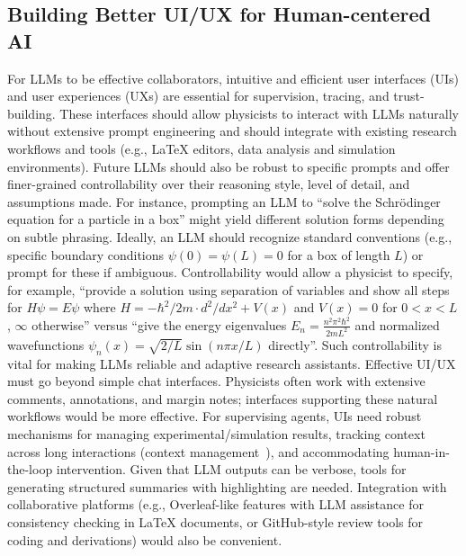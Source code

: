 \subsection{Building Better UI/UX for Human-centered AI}
\label{sec:building_better_ui_ux}
For LLMs to be effective collaborators, intuitive and efficient user interfaces (UIs) and user experiences (UXs) are essential for supervision, tracing, and trust-building. These interfaces should allow physicists to interact with LLMs naturally without extensive prompt engineering and should integrate with existing research workflows and tools (e.g., LaTeX editors, data analysis and simulation environments).
Future LLMs should also be robust to specific prompts and offer finer-grained controllability over their reasoning style, level of detail, and assumptions made. For instance, prompting an LLM to ``solve the Schr{\"o}dinger equation for a particle in a box'' might yield different solution forms depending on subtle phrasing. Ideally, an LLM should recognize standard conventions (e.g., specific boundary conditions $\psi(0)=\psi(L)=0$ for a box of length $L$) or prompt for these if ambiguous. Controllability would allow a physicist to specify, for example, ``provide a solution using separation of variables and show all steps for $H\psi = E\psi$ where $H = -\hbar^2/2m \cdot d^2/dx^2 + V(x)$ and $V(x)=0$ for $0<x<L$, $\infty$ otherwise'' versus ``give the energy eigenvalues $E_n = \frac{n^2\pi^2\hbar^2}{2mL^2}$ and normalized wavefunctions $\psi_n(x) = \sqrt{2/L}\sin(n\pi x/L)$ directly''. Such controllability is vital for making LLMs reliable and adaptive research assistants.
Effective UI/UX must go beyond simple chat interfaces. Physicists often work with extensive comments, annotations, and margin notes; interfaces supporting these natural workflows would be more effective. For supervising agents, UIs need robust mechanisms for managing experimental/simulation results, tracking context across long interactions (context management~\cite{Sumers2023Cognitive}), and accommodating human-in-the-loop intervention. Given that LLM outputs can be verbose, tools for generating structured summaries with highlighting are needed. Integration with collaborative platforms (e.g., Overleaf-like features with LLM assistance for consistency checking in \LaTeX{} documents, or GitHub-style review tools for coding and derivations) would also be convenient.

